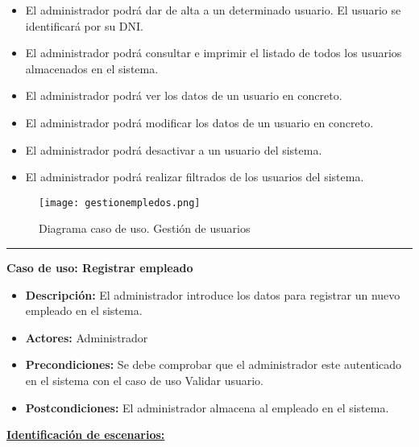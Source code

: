\begin{itemize}
 \item El administrador podrá dar de alta a un determinado usuario. El usuario se identificará por su DNI. 
 \item El administrador podrá consultar e imprimir el listado de todos los usuarios almacenados en el sistema.
 \item El administrador podrá ver los datos de un usuario en concreto.
 \item El administrador podrá modificar los datos de un usuario en concreto.
 \item El administrador podrá desactivar a un usuario del sistema.
 \item El administrador podrá realizar filtrados de los usuarios del sistema.

\end{itemize}
\begin{figure}[H]
  \centering
    \texttt{[image: gestionempledos.png]}
  \caption{Diagrama caso de uso. Gestión de usuarios}
  \label{cu4}
\end{figure}
\smallskip
\hrule height 1pt
\smallskip
\textbf{Caso de uso: Registrar empleado}
\begin{itemize}\renewcommand{\labelitemi}{$\cdot$}
 \item \textbf{Descripción:} El administrador introduce los datos para registrar un nuevo empleado en el sistema.
  \item \textbf{Actores:} Administrador
  \item \textbf{Precondiciones:} Se debe comprobar que el administrador este autenticado en el sistema con el caso de uso Validar usuario.
  \item \textbf{Postcondiciones:} El administrador almacena al empleado en el sistema.
\end{itemize}
\underline{\textbf{Identificación de escenarios:}}
